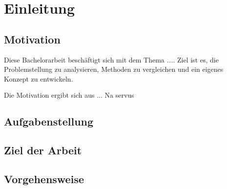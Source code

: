 \chapter{Einleitung}
\section{Motivation}
Diese Bachelorarbeit beschäftigt sich mit dem Thema \emph{...}.
Ziel ist es, die Problemstellung zu analysieren, Methoden zu vergleichen
und ein eigenes Konzept zu entwickeln.

Die Motivation ergibt sich aus ...
Na servus

\section{Aufgabenstellung}
\section{Ziel der Arbeit}
\section{Vorgehensweise}